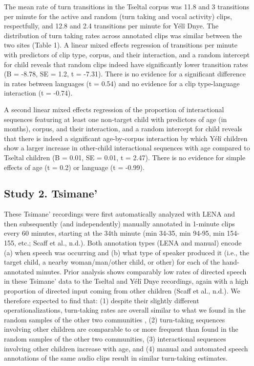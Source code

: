 \documentclass[10pt, letterpaper]{article}
\begin{document}
The mean rate of turn transitions in the Tseltal corpus was 11.8 and 3
transitions per minute for the active and random (turn taking and vocal
activity) clips, respectfully, and 12.8 and 2.4 transitions per minute
for Yélî Dnye. The distribution of turn taking rates across annotated
clips was similar between the two sites (Table 1). A linear mixed
effects regression of transitions per minute with predictors of clip
type, corpus, and their interaction, and a random intercept for child
reveals that random clips indeed have significantly lower transition
rates (B = -8.78, SE = 1.2, t = -7.31). There is no evidence for a
significant difference in rates between languages (t = 0.54) and no
evidence for a clip type-language interaction (t = -0.74).

A second linear mixed effects regression of the proportion of
interactional sequences featuring at least one non-target child with
predictors of age (in months), corpus, and their interaction, and a
random intercept for child reveals that there is indeed a significant
age-by-corpus interaction by which Yélî children show a larger increase
in other-child interactional sequences with age compared to Tseltal
children (B = 0.01, SE = 0.01, t = 2.47). There is no evidence for
simple effects of age (t = 0.2) or language (t = -0.99).

\hypertarget{study-2.-tsimane}{%
\subsection{Study 2. Tsimane'}\label{study-2.-tsimane}}

These Tsimane' recordings were first automatically analyzed with LENA
and then subsequently (and independently) manually annotated in 1-minute
clips every 60 minutes, starting at the 34th minute (min 34-35, min
94-95, min 154-155, etc.; Scaff et al., n.d.). Both annotation types
(LENA and manual) encode (a) when speech was occurring and (b) what type
of speaker produced it (i.e., the target child, a nearby woman/man/other
child, or other) for each of the hand-annotated minutes. Prior analysis
shows comparably low rates of directed speech in these Tsimane' data to
the Tseltal and Yélî Dnye recordings, again with a high proportion of
directed input coming from other children (Scaff et al., n.d.). We
therefore expected to find that: (1) despite their slightly different
operationalizations, turn-taking rates are overall similar to what we
found in the random samples of the other two communities , (2)
turn-taking sequences involving other children are comparable to or more
frequent than found in the random samples of the other two communities,
(3) interactional sequences involving other children increase with age,
and (4) manual and automated speech annotations of the same audio clips
result in similar turn-taking estimates.
\end{document}
